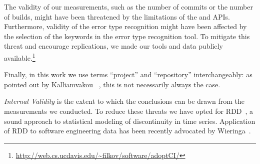 The validity of our measurements, such as the number of commits or the 
number of builds, might have been threatened by the limitations of the \GH 
and \Tvis APIs.
Furthermore, validity of the error type recognition might have been affected 
by the selection of the keywords in the error type recognition tool. 
To mitigate this threat and encourage replications, we made our tools 
and data publicly available.\footnote{\url{http://web.cs.ucdavis.edu/~filkov/software/adoptCI/}}

Finally, in this work we use terms ``project'' and ``repository'' interchangeably: 
as pointed out by Kalliamvakou \etal~\cite{Kalliamvakou2014Promises}, this is 
not necessarily always the case. 


\smallskip \emph{Internal Validity} is the extent to which the conclusions can 
be drawn from the measurements we conducted. 
To reduce these threats we have opted for RDD~\cite{imbens2008regression}, 
a sound approach to statistical modeling of discontinuity in time series. 
Application of RDD to software engineering data has been recently advocated 
by Wieringa~\cite{Wieringa}.
 
